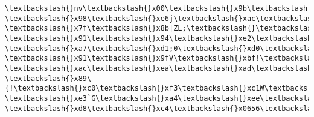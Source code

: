 \documentclass[11pt]{article}
\begin{document}
\begin{Verbatim}[commandchars=\\\{\}]
\textbackslash{}nv\textbackslash{}x00\textbackslash{}x9b\textbackslash{}r/\textbackslash{}xa0\textbackslash{}xe1\textbackslash{}x83\textbackslash{}x15\textbackslash{}xa6\textbackslash{}x99(\textbackslash{}x9bkv\textbackslash{}x02\textbackslash{}xe0\textbackslash{}x1d(\textbackslash{}xeb\textbackslash{}xfe\textbackslash{}x0f@
\textbackslash{}x98\textbackslash{}xe6j\textbackslash{}xac\textbackslash{}x8aQ\textbackslash{}xdb\textbackslash{}xac\textbackslash{}x944\textbackslash{}xc4\textbackslash{}xaf\textbackslash{}x00t\textbackslash{}xc8U\textbackslash{}xef\textbackslash{}xb4\textbackslash{}xee\textbackslash{}x872\^{}
\textbackslash{}x7f\textbackslash{}x8b|ZL;\textbackslash{}\textbackslash{}kD\textbackslash{}xc19\textbackslash{}xd2f\textbackslash{}xe6\textbackslash{}xeaz\textbackslash{}xfd\textbackslash{}n\textbackslash{}r\textbackslash{}x9a\textbackslash{}x17GD\textbackslash{}x8d\textbackslash{}xda\textbackslash{}xd3\textbackslash{}xabC\textbackslash{}xa7\$
\textbackslash{}x91\textbackslash{}x94\textbackslash{}xe2\textbackslash{}x0eS\textbackslash{}xae\textbackslash{}x99V":c\textbackslash{}xa3\textbackslash{}xce5\textbackslash{}x9f\textbackslash{}xb3]\textbackslash{}x9f\textbackslash{}x0f\textbackslash{}x15\textbackslash{}x00c\textbackslash{}xab\textbackslash{}x12\textbackslash{}x14
\textbackslash{}xa7\textbackslash{}xd1;0\textbackslash{}xd0\textbackslash{}xc2\textbackslash{}x0b\textbackslash{}xbf\textbackslash{}x8a7\textbackslash{}x94J\textbackslash{}x8e\textbackslash{}xbf\textbackslash{}xb1\textbackslash{}xbc\textbackslash{}x01\textbackslash{}x99\textbackslash{}xe6\textbackslash{}xfc\textbackslash{}xc8
\textbackslash{}x91\textbackslash{}x9fV\textbackslash{}xbf!\textbackslash{}xaa \textbackslash{}xac\textbackslash{}xea\textbackslash{}xad\textbackslash{}x0b\textbackslash{}xca\textbackslash{}xa8\textbackslash{}xd0\textbackslash{}xafTY)\textbackslash{}xed@\textbackslash{}x1c\textbackslash{}xaf\textbackslash{}xd9
\textbackslash{}x89\{!\textbackslash{}xc0\textbackslash{}xf3\textbackslash{}xc1W\textbackslash{}xf7\textbackslash{}x02\textbackslash{}xec\textbackslash{}xd3\textbackslash{}x81\textbackslash{}x81\textbackslash{}x03ijO\textbackslash{}xe8\textbackslash{}xb3\textbackslash{}x1d.B\textbackslash{}x84\textbackslash{}r\textbackslash{}x934b
\textbackslash{}xe3`G\textbackslash{}xa4\textbackslash{}xee\textbackslash{}xfd\textbackslash{}xfa\textbackslash{}xa6\textbackslash{}xa3c\textbackslash{}xe7\textbackslash{}xacK-\textbackslash{}xd8\textbackslash{}xc4\textbackslash{}x0656\textbackslash{}xbc\textbackslash{}xaaM\textbackslash{}xc1\textbackslash{}x82F\textbackslash{}x15

\end{Verbatim}
\end{document}
